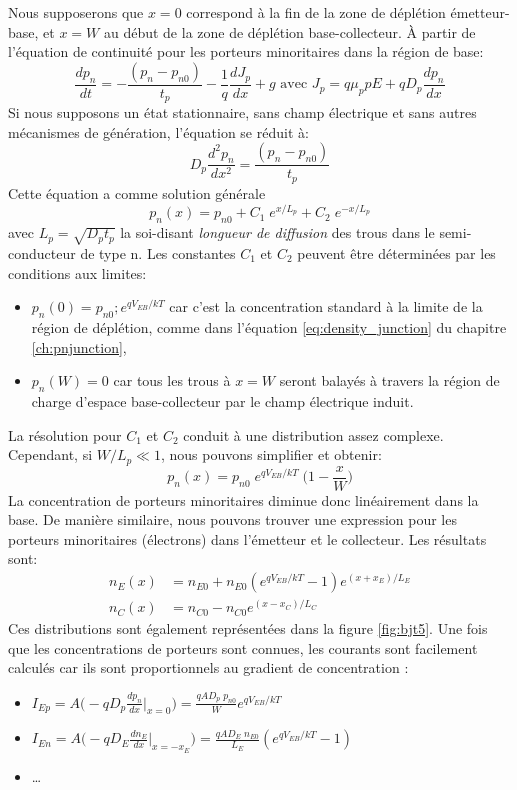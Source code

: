 Nous supposerons que $x=0$ correspond à la fin de la zone de déplétion émetteur-base, et $x=W$ au début de la zone de déplétion base-collecteur. À partir de l'équation de continuité pour les porteurs minoritaires dans la région de base:
$$
\frac{dp_n}{dt} = - \frac{(p_n-p_{n0})}{t_p} - \frac{1}{q} \frac{d J_p}{dx} + g \text{ avec }  J_p = q \mu_p p E + q D_p \frac{dp_n}{dx}
$$
Si nous supposons un état stationnaire, sans champ électrique et sans autres mécanismes de génération, l'équation se réduit à:
$$
D_p \frac{d^2 p_n}{dx^2} = \frac{(p_n-p_{n0})}{t_p}
$$
Cette équation a comme solution générale
$$
p_n(x) = p_{n0} + C_1  \; e^{x/L_p} + C_2 \;  e^{-x/L_p}
$$
avec $L_p = \sqrt{D_p t_p}$ la soi-disant \emph{longueur de diffusion} des trous dans le semi-conducteur de type n. Les constantes $C_1$ et $C_2$ peuvent être déterminées par les conditions aux limites:
\begin{itemize}
	\item $p_n(0) = p_{n0} ; e^{qV_{EB}/kT}$ car c'est la concentration standard à la limite de la région de déplétion, comme dans l'équation \ref{eq:density_junction} du chapitre \ref{ch:pnjunction},
	\item $p_n(W) = 0$ car tous les trous à $x=W$ seront balayés à travers la région de charge d'espace base-collecteur par le champ électrique induit.
\end{itemize}
La résolution pour $C_1$ et $C_2$ conduit à une distribution assez complexe. Cependant, si $W/L_p \ll 1$, nous pouvons simplifier et obtenir:
$$
p_n(x) = p_{n0}\; e^{qV_{EB}/kT} \; \Big(1 - \frac{x}{W} \Big)
$$
La concentration de porteurs minoritaires diminue donc linéairement dans la base. De manière similaire, nous pouvons trouver une expression pour les porteurs minoritaires (électrons) dans l'émetteur et le collecteur. Les résultats sont:
\begin{equation}
    \begin{split}
        n_E(x) &= n_{E0} + n_{E0} (e^{qV_{EB}/kT} - 1) e^{(x+x_E)/L_E}\\
        n_C(x) &= n_{C0} - n_{C0} e^{(x-x_C)/L_C}
    \end{split}
\end{equation}
Ces distributions sont également représentées dans la figure \ref{fig:bjt5}. Une fois que les concentrations de porteurs sont connues, les courants sont facilement calculés car ils sont proportionnels au gradient de concentration :
\begin{itemize}
    \item $I_{Ep} = A \Big(-q D_p \frac{dp_n}{dx}|_{x=0}\Big) = \frac{qAD_p \; p_{n0}}{W} e^{qV_{EB}/kT}$
    \item $I_{En} = A \Big(-q D_E \frac{dn_E}{dx}|_{x=-x_E}\Big) = \frac{qAD_E \; n_{E0}}{L_E} (e^{qV_{EB}/kT}-1)$
    \item \ldots
\end{itemize}
